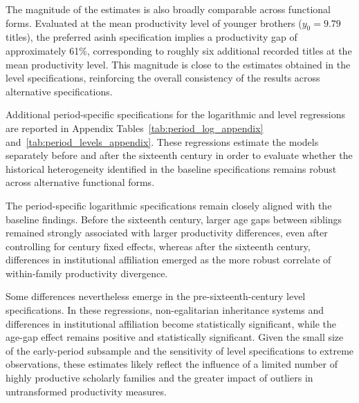 The magnitude of the estimates is also broadly comparable across functional forms. Evaluated at the mean productivity level of younger brothers ($y_0 = 9.79$ titles), the preferred asinh specification implies a productivity gap of approximately 61\%, corresponding to roughly six additional recorded titles at the mean productivity level. This magnitude is close to the estimates obtained in the level specifications, reinforcing the overall consistency of the results across alternative specifications.

Additional period-specific specifications for the logarithmic and level regressions are reported in Appendix Tables~\ref{tab:period_log_appendix} and~\ref{tab:period_levels_appendix}. These regressions estimate the models separately before and after the sixteenth century in order to evaluate whether the historical heterogeneity identified in the baseline specifications remains robust across alternative functional forms.

The period-specific logarithmic specifications remain closely aligned with the baseline findings. Before the sixteenth century, larger age gaps between siblings remained strongly associated with larger productivity differences, even after controlling for century fixed effects, whereas after the sixteenth century, differences in institutional affiliation emerged as the more robust correlate of within-family productivity divergence.

Some differences nevertheless emerge in the pre-sixteenth-century level specifications. In these regressions, non-egalitarian inheritance systems and differences in institutional affiliation become statistically significant, while the age-gap effect remains positive and statistically significant. Given the small size of the early-period subsample and the sensitivity of level specifications to extreme observations, these estimates likely reflect the influence of a limited number of highly productive scholarly families and the greater impact of outliers in untransformed productivity measures.


